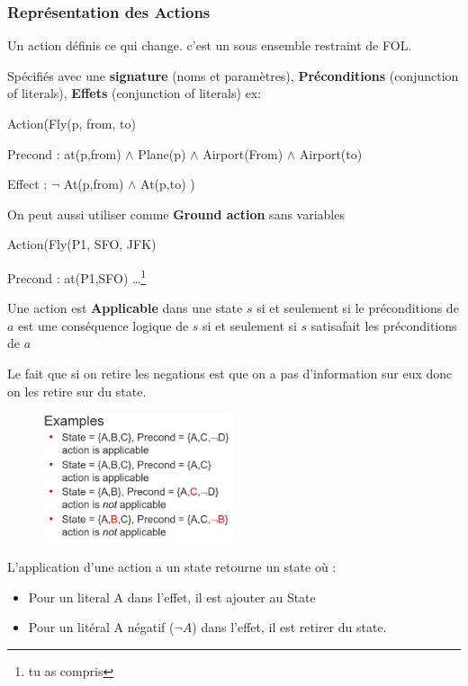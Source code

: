 		\subsubsection{Représentation des Actions}
			Un action définis ce qui change. c'est un sous ensemble restraint de FOL.
		
			Spécifiés avec une \textbf{signature} (noms et paramètres), \textbf{Préconditions} (conjunction of literals), \textbf{Effets} (conjunction of literals)
			ex:
			
			Action(Fly(p, from, to)
			
			Precond : at(p,from) $\land$ Plane(p) $\land$ Airport(From) $\land$ Airport(to)
			
			Effect : $\neg$ At(p,from) $\land$ At(p,to) )
			
			On peut aussi utiliser comme \textbf{Ground action} sans variables 
			
			Action(Fly(P1, SFO, JFK)
			
			Precond : at(P1,SFO) \dots \footnote{tu as compris}
			
			Une action est \textbf{Applicable} dans une state $s$ si et seulement si le préconditions de $a$ est une conséquence logique de $s$ si et seulement si $s$ satisafait les préconditions de $a$
			
			Le fait que si on retire les negations est que on a pas d'information sur eux donc on les retire sur du state.
			
			\begin{figure}[H]
				\centering
				\includegraphics[width=0.5\textwidth]{img/ex.png}
			\end{figure}
			
			L'application d'une action a un state retourne un state où :
			\begin{itemize}
				\item Pour un literal A dans l'effet, il est ajouter au State
				\item Pour un litéral A négatif ($\neg A$) dans l'effet, il est retirer du state.
			\end{itemize}
			
